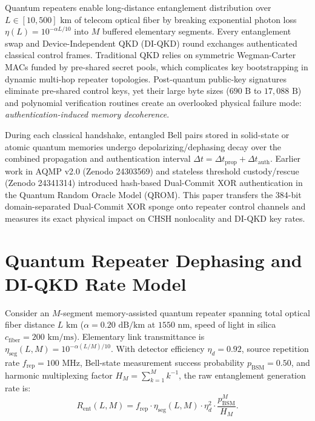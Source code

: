 \documentclass[conference,compsoc]{IEEEtran}
\begin{document}
Quantum repeaters enable long-distance entanglement distribution over $L \in [10, 500]\text{ km}$ of telecom optical fiber by breaking exponential photon loss $\eta(L) = 10^{-\alpha L / 10}$ into $M$ buffered elementary segments. Every entanglement swap and Device-Independent QKD (DI-QKD) round exchanges authenticated classical control frames. Traditional QKD relies on symmetric Wegman-Carter MACs funded by pre-shared secret pools, which complicates key bootstrapping in dynamic multi-hop repeater topologies. Post-quantum public-key signatures eliminate pre-shared control keys, yet their large byte sizes ($690\text{ B}$ to $17{,}088\text{ B}$) and polynomial verification routines create an overlooked physical failure mode: \emph{authentication-induced memory decoherence}.

During each classical handshake, entangled Bell pairs stored in solid-state or atomic quantum memories undergo depolarizing/dephasing decay over the combined propagation and authentication interval $\Delta t = \Delta t_{\text{prop}} + \Delta t_{\text{auth}}$. Earlier work in AQMP v2.0 (Zenodo 24303569) \cite{aqmp1} and stateless threshold custody/rescue (Zenodo 24341314) \cite{aqmp2} introduced hash-based Dual-Commit XOR authentication in the Quantum Random Oracle Model (QROM). This paper transfers the 384-bit domain-separated Dual-Commit XOR sponge onto repeater control channels and measures its exact physical impact on CHSH nonlocality and DI-QKD key rates.

\section{Quantum Repeater Dephasing and DI-QKD Rate Model}
\label{sec:physics}

Consider an $M$-segment memory-assisted quantum repeater spanning total optical fiber distance $L\text{ km}$ ($\alpha = 0.20\text{ dB/km}$ at $1550\text{ nm}$, speed of light in silica $c_{\text{fiber}} = 200\text{ km/ms}$). Elementary link transmittance is $\eta_{\text{seg}}(L, M) = 10^{-\alpha(L/M)/10}$. With detector efficiency $\eta_d = 0.92$, source repetition rate $f_{\text{rep}} = 100\text{ MHz}$, Bell-state measurement success probability $p_{\text{BSM}} = 0.50$, and harmonic multiplexing factor $H_M = \sum_{k=1}^M k^{-1}$, the raw entanglement generation rate is:
\begin{equation}
R_{\text{ent}}(L, M) = f_{\text{rep}} \cdot \eta_{\text{seg}}(L, M) \cdot \eta_d^2 \cdot \frac{p_{\text{BSM}}^M}{H_M}.
\end{equation}
\end{document}
